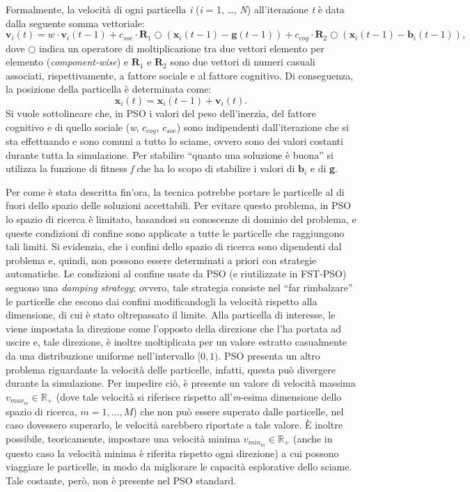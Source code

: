 Formalmente, la velocità di ogni particella \textit{i} (\textit{i} = 1, \dots, \textit{N}) all'iterazione \textit{t} è data dalla seguente somma vettoriale:
\[\textbf{v}_i(t) = \textit{w}\cdot\textbf{v}_i(t - 1) + c_{soc}\cdot\textbf{R}_1\bigcirc(\textbf{x}_i(t - 1) - \textbf{g}(t - 1)) + c_{cog}\cdot\textbf{R}_2\bigcirc(\textbf{x}_i(t - 1) - \textbf{b}_i(t - 1)),\]
dove $\bigcirc$ indica un operatore di moltiplicazione tra due vettori elemento per elemento (\textit{component-wise}) e $\textbf{R}_1$ e $\textbf{R}_2$ sono due vettori di numeri casuali associati, rispettivamente, a fattore sociale e al fattore cognitivo. Di conseguenza, la posizione della particella è determinata come: 
\[\textbf{x}_i(t) = \textbf{x}_i(t - 1) + \textbf{v}_i(t).\] 
Si vuole sottolineare che, in PSO i valori del peso dell'inerzia, del fattore cognitivo e di quello sociale (\textit{w}, $c_{cog}$, $c_{soc}$) sono indipendenti dall'iterazione che si sta effettuando e sono comuni a tutto lo sciame, ovvero sono dei valori costanti durante tutta la simulazione. Per stabilire “quanto una soluzione è buona” si utilizza la funzione di fitness \textit{f} che ha lo scopo di stabilire i valori di $\textbf{b}_i$ e di \textbf{g}.

Per come è stata descritta fin'ora, la tecnica potrebbe portare le particelle al di fuori dello spazio delle soluzioni accettabili. 
Per evitare questo problema, in PSO lo spazio di ricerca è limitato, basandosi su conoscenze di dominio del problema, e queste condizioni di confine sono applicate a tutte le particelle che raggiungono tali limiti.
Si evidenzia, che i confini dello spazio di ricerca sono dipendenti dal problema e, quindi, non possono essere determinati a priori con strategie automatiche. 
Le condizioni al confine usate da PSO (e riutilizzate in FST-PSO) seguono una \textit{damping strategy}; ovvero, tale strategia consiste nel “far rimbalzare” le particelle che escono dai confini modificandogli la velocità rispetto alla dimensione, di cui è stato oltrepassato il limite. 
Alla particella di interesse, le viene impostata la direzione come l'opposto della direzione che l'ha portata ad uscire e, tale direzione, è inoltre moltiplicata per un valore estratto casualmente da una distribuzione uniforme nell'intervallo $[0, 1)$. 
PSO presenta un altro problema riguardante la velocità delle particelle, infatti, questa può divergere durante la simulazione. 
Per impedire ciò, è presente un valore di velocità massima $\textit{v}_{max_m} \in \mathbb{R}_+$ (dove tale velocità si riferisce rispetto all'\textit{m}-esima dimensione dello spazio di ricerca, $\textit{m} = 1, \dots, \textit{M}$) che non può essere superato dalle particelle, nel caso dovessero superarlo, le velocità sarebbero riportate a tale valore. 
È inoltre possibile, teoricamente, impostare una velocità minima $\textit{v}_{min_m} \in \mathbb{R}_+$ (anche in questo caso la velocità minima è riferita rispetto ogni direzione) a cui possono viaggiare le particelle, in modo da migliorare le capacità esplorative dello sciame. Tale costante, però, non è presente nel PSO standard.

